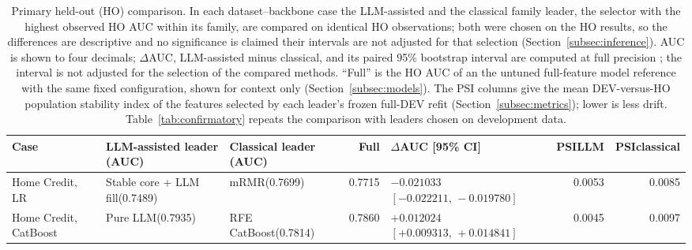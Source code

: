 \documentclass[final,5p,twocolumn]{elsarticle}
\providecommand{\DIFaddtex}[1]{{\protect\color{blue} \sf #1}} %
\providecommand{\DIFdeltex}[1]{{\protect\color{red} \scriptsize #1}} %
\providecommand{\DIFaddFL}[1]{\DIFadd{#1}} %
\providecommand{\DIFdelFL}[1]{\DIFdel{#1}} %
\providecommand{\DIFaddbeginFL}{} %
\providecommand{\DIFaddendFL}{} %
\providecommand{\DIFdelbeginFL}{} %
\providecommand{\DIFdelendFL}{} %
\providecommand{\DIFadd}[1]{\texorpdfstring{\DIFaddtex{#1}}{#1}} %
\providecommand{\DIFdel}[1]{\texorpdfstring{\DIFdeltex{#1}}{}} %
\begin{document}
\begin{table}[htbp]
\centering
\scriptsize
\setlength{\tabcolsep}{3pt}
\begin{threeparttable}
\caption{Primary held-out (HO) comparison. In each dataset--backbone case the LLM-assisted and the classical family leader, the selector with the highest observed HO AUC within its family, are compared on identical HO observations; both were chosen on the HO results, so the differences are descriptive and \DIFdelbeginFL \DIFdelFL{no significance is claimed}\DIFdelendFL \DIFaddbeginFL \DIFaddFL{their intervals are not adjusted for that selection (Section~\ref{subsec:inference})}\DIFaddendFL . AUC is shown to four decimals; $\Delta$AUC, LLM-assisted minus classical, and its paired 95\% bootstrap interval are computed at full precision\DIFdelbeginFL \DIFdelFL{; the interval is not adjusted for the selection of the compared methods}\DIFdelendFL . ``Full'' is the HO AUC of \DIFdelbeginFL \DIFdelFL{an }\DIFdelendFL \DIFaddbeginFL \DIFaddFL{the }\DIFaddendFL untuned full-feature \DIFdelbeginFL \DIFdelFL{model }\DIFdelendFL \DIFaddbeginFL \DIFaddFL{reference }\DIFaddendFL with the same fixed configuration, \DIFdelbeginFL \DIFdelFL{shown for }\DIFdelendFL context only \DIFaddbeginFL \DIFaddFL{(Section~\ref{subsec:models})}\DIFaddendFL . The PSI columns give the mean DEV-versus-HO population stability index of the features selected by each leader's frozen full-DEV refit (Section~\ref{subsec:metrics}); lower is less drift. Table~\ref{tab:confirmatory} repeats the comparison with leaders chosen on development data.}
\label{tab:primary_results}
\begin{tabular}{@{}L{24mm}L{27mm}L{24mm}rL{38mm}rr@{}}
\toprule
Case & LLM-assisted leader (AUC) & Classical leader (AUC) & Full & $\Delta$AUC [95\% CI] & PSI\newline LLM & PSI\newline classical \\
\midrule
Home Credit, LR & Stable core + LLM fill\newline (0.7489) & mRMR\newline (0.7699) & 0.7715 & $-0.021033$\newline $[-0.022211,\,-0.019780]$ & 0.0053 & 0.0085 \\
\addlinespace
Home Credit, CatBoost & Pure LLM\newline (0.7935) & RFE CatBoost\newline (0.7814) & 0.7860 & $+0.012024$\newline $[+0.009313,\,+0.014841]$ & 0.0045 & 0.0097 \\

\end{tabular}
\end{threeparttable}
\end{table}
\end{document}
